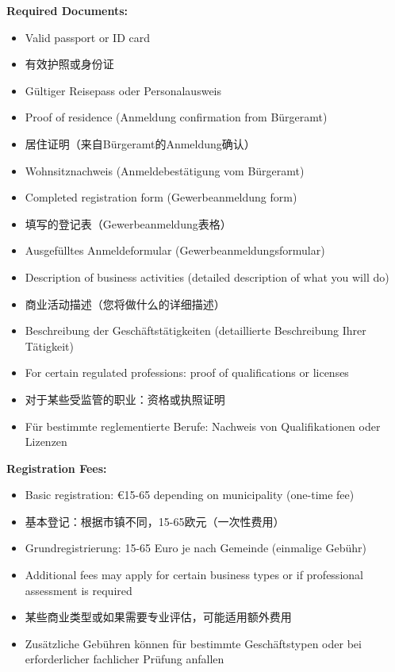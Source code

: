 \textbf{Required Documents:}
\begin{itemize}
    \item Valid passport or ID card
    \item 有效护照或身份证
    \item Gültiger Reisepass oder Personalausweis
    
    \item Proof of residence (Anmeldung confirmation from Bürgeramt)
    \item 居住证明（来自Bürgeramt的Anmeldung确认）
    \item Wohnsitznachweis (Anmeldebestätigung vom Bürgeramt)
    
    \item Completed registration form (Gewerbeanmeldung form)
    \item 填写的登记表（Gewerbeanmeldung表格）
    \item Ausgefülltes Anmeldeformular (Gewerbeanmeldungsformular)
    
    \item Description of business activities (detailed description of what you will do)
    \item 商业活动描述（您将做什么的详细描述）
    \item Beschreibung der Geschäftstätigkeiten (detaillierte Beschreibung Ihrer Tätigkeit)
    
    \item For certain regulated professions: proof of qualifications or licenses
    \item 对于某些受监管的职业：资格或执照证明
    \item Für bestimmte reglementierte Berufe: Nachweis von Qualifikationen oder Lizenzen
\end{itemize}

\textbf{Registration Fees:}
\begin{itemize}
    \item Basic registration: €15-65 depending on municipality (one-time fee)
    \item 基本登记：根据市镇不同，15-65欧元（一次性费用）
    \item Grundregistrierung: 15-65 Euro je nach Gemeinde (einmalige Gebühr)
    
    \item Additional fees may apply for certain business types or if professional assessment is required
    \item 某些商业类型或如果需要专业评估，可能适用额外费用
    \item Zusätzliche Gebühren können für bestimmte Geschäftstypen oder bei erforderlicher fachlicher Prüfung anfallen
\end{itemize}

